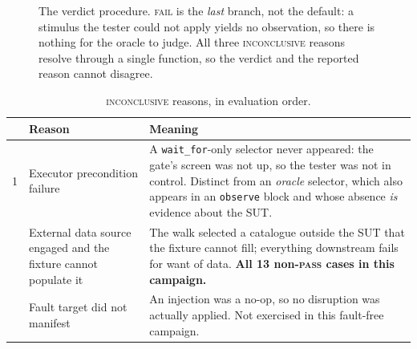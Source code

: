 \documentclass[11pt,a4paper]{article}
\begin{document}
\begin{figure}[h]
\centering
{}
\caption{The verdict procedure. \textsc{fail} is the \emph{last} branch, not the
default: a stimulus the tester could not apply yields no observation, so there is
nothing for the oracle to judge. All three \textsc{inconclusive} reasons resolve
through a single function, so the verdict and the reported reason cannot disagree.}
\label{fig:verdict}
\end{figure}

\begin{table}[h]
\centering\footnotesize
\caption{\textsc{inconclusive} reasons, in evaluation order.}
\label{tab:inconc}
\begin{tabular}{@{}rp{5.2cm}p{7.6cm}@{}}
\toprule
& \textbf{Reason} & \textbf{Meaning} \\
\midrule
1 & Executor precondition failure & A \texttt{wait\_for}-only selector never
appeared: the gate's screen was not up, so the tester was not in control. Distinct
from an \emph{oracle} selector, which also appears in an \texttt{observe} block and
whose absence \emph{is} evidence about the SUT. \\
\addlinespace
2 & External data source engaged and the fixture cannot populate it & The walk
selected a catalogue outside the SUT that the fixture cannot fill; everything
downstream fails for want of data. \textbf{All 13 non-\textsc{pass} cases in this
campaign.} \\
\addlinespace
3 & Fault target did not manifest & An injection was a no-op, so no disruption was
actually applied. Not exercised in this fault-free campaign. \\
\bottomrule
\end{tabular}
\end{table}
\end{document}
